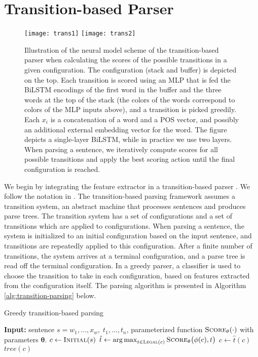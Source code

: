\documentclass[11pt]{article}
\DeclareMathOperator*{\argmax}{arg\,max}
\begin{document}
\section{Transition-based Parser}
\label{sec:archybrid}

\begin{figure*}[ht!]
\texttt{[image: trans1]}
\texttt{[image: trans2]}

\caption{\small Illustration of the neural model scheme of the transition-based parser when calculating the scores of the possible transitions in a given configuration.
The configuration (stack and buffer) is depicted on the top. Each transition is scored using an MLP that is fed the \mbox{BiLSTM} encodings of the first word in the buffer and the three words at the top of the stack (the colors of the words correspond to colors of the MLP inputs above), and a transition is picked greedily. Each $x_i$ is a concatenation of a word and a POS vector, and possibly an additional external embedding vector for the word. The figure depicts a single-layer BiLSTM, while in practice we use two layers. When parsing a sentence, we iteratively compute scores for all possible transitions and apply the best scoring action until the final configuration is reached.}
\label{fig:firstorder}
\end{figure*}

We begin by integrating the feature extractor in a transition-based parser
\cite{nivre2008algorithms}. We follow the notation in
.
The transition-based parsing framework assumes a transition system, an abstract
machine that processes sentences and produces parse trees. The transition system
has a set of configurations and a set of transitions which are applied to
configurations. When parsing a sentence, the system is initialized to an initial
configuration based on the input sentence, and transitions are repeatedly
applied to this configuration. After a finite number of transitions, the system
arrives at a terminal configuration, and a parse tree is read off the terminal
configuration. In a greedy parser, a classifier is used to choose the transition
to take in each configuration, based on features extracted from the
configuration itself. The parsing algorithm is presented in Algorithm
\ref{alg:transition-parsing} below.

\begin{algorithm}[h]
   \caption{Greedy transition-based parsing}
   \label{alg:transition-parsing}
\begin{algorithmic}[1]
   \State \textbf{Input:} sentence $s = w_1,\dots,x_w,\;t_1,\dots,t_n$, parameterized function
   $\textsc{Score}_\mathbf{\theta}(\cdot)$ with parameters $\mathbf{\theta}$.
   \State $c \gets \textsc{Initial}(s)$\label{line:init}
   \State $\hat{t} \gets \argmax_{t\in\textsc{Legal}(c)}
   \textsc{Score}_\mathbf{\theta}\big(\phi(c), t\big)$\label{line:score}
   \State $c \gets \hat{t}(c)$  
   \EndWhile
   \State \Return $tree(c)$\label{line:final}
\end{algorithmic}
\end{algorithm}
\end{document}
